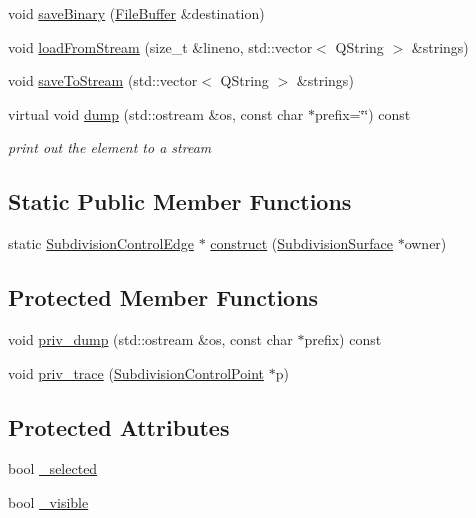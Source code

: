 \begin{DoxyCompactItemize}
\item 
void \hyperlink{classShipCAD_1_1SubdivisionControlEdge_a572f4331ef0ab6f241583fc8d36cb93e}{save\-Binary} (\hyperlink{classShipCAD_1_1FileBuffer}{File\-Buffer} \&destination)
\item 
void \hyperlink{classShipCAD_1_1SubdivisionControlEdge_a7c6098254d4a92c44d01c3e247b29782}{load\-From\-Stream} (size\-\_\-t \&lineno, std\-::vector$<$ Q\-String $>$ \&strings)
\item 
void \hyperlink{classShipCAD_1_1SubdivisionControlEdge_a21c0e8b4d4cd138ddd0bbcc707775040}{save\-To\-Stream} (std\-::vector$<$ Q\-String $>$ \&strings)
\item 
virtual void \hyperlink{classShipCAD_1_1SubdivisionControlEdge_abdfa96ff05eff404214a92d38d7eb715}{dump} (std\-::ostream \&os, const char $\ast$prefix=\char`\"{}\char`\"{}) const 
\begin{DoxyCompactList}\small\item\em print out the element to a stream \end{DoxyCompactList}\end{DoxyCompactItemize}
\subsection*{Static Public Member Functions}
\begin{DoxyCompactItemize}
\item 
static \hyperlink{classShipCAD_1_1SubdivisionControlEdge}{Subdivision\-Control\-Edge} $\ast$ \hyperlink{classShipCAD_1_1SubdivisionControlEdge_a20fc507b201766b6e3d0560595946fac}{construct} (\hyperlink{classShipCAD_1_1SubdivisionSurface}{Subdivision\-Surface} $\ast$owner)
\end{DoxyCompactItemize}
\subsection*{Protected Member Functions}
\begin{DoxyCompactItemize}
\item 
void \hyperlink{classShipCAD_1_1SubdivisionControlEdge_acc4cee57db50beb1dcc6361f7f2c62af}{priv\-\_\-dump} (std\-::ostream \&os, const char $\ast$prefix) const 
\item 
void \hyperlink{classShipCAD_1_1SubdivisionControlEdge_aec6ff8caa6996ae5a9d2e58d5d2b0344}{priv\-\_\-trace} (\hyperlink{classShipCAD_1_1SubdivisionControlPoint}{Subdivision\-Control\-Point} $\ast$p)
\end{DoxyCompactItemize}
\subsection*{Protected Attributes}
\begin{DoxyCompactItemize}
\item 
bool \hyperlink{classShipCAD_1_1SubdivisionControlEdge_a8e67d30ef7ef87ff599f73b59c806f58}{\-\_\-selected}
\item 
bool \hyperlink{classShipCAD_1_1SubdivisionControlEdge_a8d49343e2b6ff0ab13653849af242740}{\-\_\-visible}
\end{DoxyCompactItemize}
